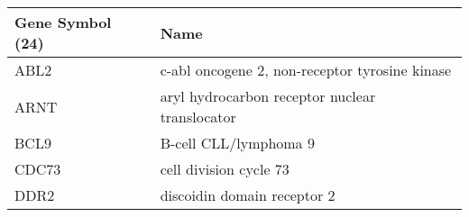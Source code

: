 \begin{tabular}{ll}
\toprule
Gene Symbol (24) &                                           Name \\
\midrule
            ABL2 & c-abl oncogene 2, non-receptor tyrosine kinase \\
            ARNT & aryl hydrocarbon receptor nuclear translocator \\
            BCL9 &                          B-cell CLL/lymphoma 9 \\
           CDC73 &                         cell division cycle 73 \\
            DDR2 &                    discoidin domain receptor 2 \\
\bottomrule
\end{tabular}
